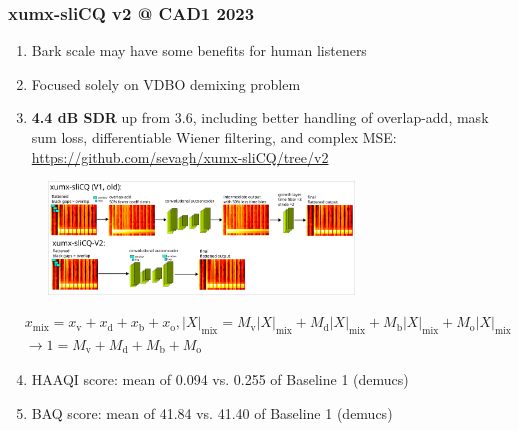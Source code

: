 \documentclass[usenames,dvipsnames]{beamer}
\begin{document}
\begin{frame}
	\frametitle{xumx-sliCQ v2 @ CAD1 2023}
        \begin{enumerate}
        \item
                Bark scale may have some benefits for human listeners
        \item
                Focused solely on VDBO demixing problem
        \item
                \textbf{4.4 dB SDR} up from 3.6, including better handling of overlap-add, mask sum loss, differentiable Wiener filtering, and complex MSE:  \url{https://github.com/sevagh/xumx-sliCQ/tree/v2}
        \end{enumerate}
        \vspace{-1em}
        \begin{figure}[ht]
		\centering
		\includegraphics[height=3cm]{./images/slicq_overlap_improved.png}
	\end{figure}
        \vspace{-2em}
                \small \begin{align}
                        & x_{\text{mix}} = x_{\text{v}} + x_{\text{d}} + x_{\text{b}} + x_{\text{o}}, |X|_{\text{mix}} = M_{\text{v}}|X|_{\text{mix}} + M_{\text{d}}|X|_{\text{mix}} + M_{\text{b}}|X|_{\text{mix}} + M_{\text{o}}|X|_{\text{mix}} \nonumber \\
                        & \rightarrow 1 = M_{\text{v}} + M_{\text{d}} + M_{\text{b}} + M_{\text{o}} \nonumber
                \end{align} \normalsize
        \begin{enumerate}
        \setcounter{enumi}{3}
        \item
                \vspace{-2em}
                HAAQI score: mean of 0.094 vs. 0.255 of Baseline 1 (demucs)
        \item
                BAQ score: mean of 41.84 vs. 41.40 of Baseline 1 (demucs)
        \end{enumerate}
\end{frame}
\end{document}
